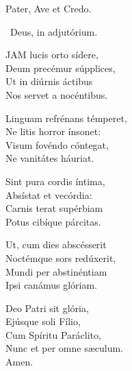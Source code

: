 

Pater, Ave et Credo.

\V\ Deus, in adjutórium.


\lettrine[lines=2]{J}{AM} lucis orto sídere,\\
Deum precémur súpplices,\\
Ut in diúrnis áctibus\\
Nos servet a nocéntibus.

Linguam refrénans témperet,\\
Ne litis horror ínsonet:\\
Visum fovéndo cóntegat,\\
Ne vanitátes háuriat.

Sint pura cordis íntima,\\
Absístat et vecórdia:\\
Carnis terat supérbiam\\
Potus cibíque párcitas.

Ut, cum dies abscésserit\\
Noctémque sors redúxerit,\\
Mundi per abstinéntiam\\
Ipsi canámus glóriam.

Deo Patri sit glória,\\
Ejúsque soli Fílio,\\
Cum Spíritu Paráclito,\\
Nunc et per omne sæculum.\\
Amen.

